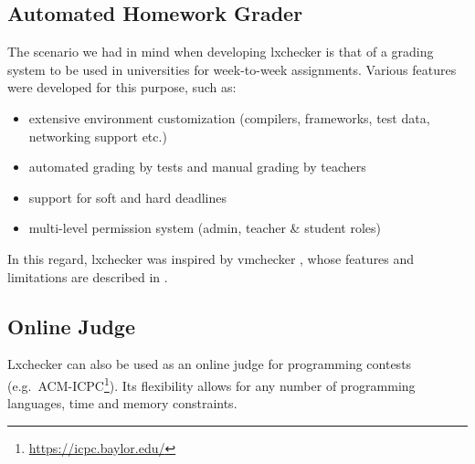 \subsection{Automated Homework Grader}
\label{sub-sec:homework}

The scenario we had in mind when developing lxchecker is that of a grading system to be used in universities for week-to-week assignments. Various features were developed for this purpose, such as:
\begin{itemize}
	\item extensive environment customization (compilers, frameworks, test data, networking support etc.)
	\item automated grading by tests and manual grading by teachers
	\item support for soft and hard deadlines
	\item multi-level permission system (admin, teacher \& student roles)
\end{itemize}

In this regard, lxchecker was inspired by vmchecker \cite{gosu}, whose features and limitations are described in .

\subsection{Online Judge}
\label{sub-sec:judge}

Lxchecker can also be used as an online judge for programming contests (e.g.\ ACM-ICPC\footnote{\url{https://icpc.baylor.edu/}}). Its flexibility allows for any number of programming languages, time and memory constraints.
